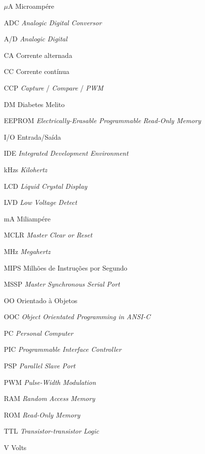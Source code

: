 \documentclass[	12pt, Times, openright, twoside, a4paper, english, brazil]{abntex2}
\begin{document}
\begin{siglas}
  \item[$\mu$A] Microampére
  \item[ADC] \emph{Analogic Digital Conversor}
  \item[A/D] \emph{Analogic Digital}
  \item[CA] Corrente alternada
  \item[CC] Corrente contínua
  \item[CCP] \emph{Capture} / \emph{Compare} / \emph{PWM}
  \item[DM] Diabetes Melito
  \item[EEPROM] \emph{Electrically-Erasable Programmable Read-Only Memory}
  \item[I/O] Entrada/Saída
  \item[IDE] \emph{Integrated Development Environment}
  \item[kHzs] \emph{Kilohertz}
  \item[LCD] \emph{Liquid Crystal Display}
  \item[LVD] \emph{Low Voltage Detect}
  \item[mA] Miliampére
  \item[MCLR] \emph{Master Clear or Reset}
  \item[MHz] \emph{Megahertz}
  \item[MIPS] Milhões de Instruções por Segundo
  \item[MSSP] \emph{Master Synchronous Serial Port}
  \item[OO] Orientado à Objetos
  \item[OOC]  \emph{Object Orientated Programming in ANSI-C}
  \item[PC] \emph{Personal Computer}
  \item[PIC]  \emph{Programmable Interface Controller}  
  \item[PSP] \emph{Parallel Slave Port}
  \item[PWM] \emph{Pulse-Width Modulation}
  \item[RAM] \emph{Random Access Memory}          
  \item[ROM] \emph{Read-Only Memory}
  \item[TTL] \emph{Transistor-transistor Logic}
  \item[V] Volts  
\end{siglas}

\end{document}
